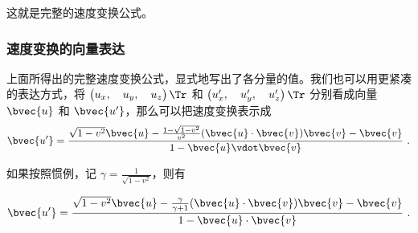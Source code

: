 这就是完整的速度变换公式。

\subsubsection{速度变换的向量表达}

上面所得出的完整速度变换公式，显式地写出了各分量的值。我们也可以用更紧凑的表达方式，将 $\left(\begin{matrix}u_x,\quad u_y,\quad u_z\end{matrix} \right)\Tr $ 和 $\left(\begin{matrix}u_x',\quad u_y',\quad u_z'\end{matrix} \right)\Tr$ 分别看成向量 $\bvec{u}$ 和 $\bvec{u'}$，那么可以把速度变换表示成
\begin{equation}\label{eq_RelVel_5}
\bvec{u'}=\frac{\sqrt{1-v^2}\bvec{u}-\frac{1-\sqrt{1-v^2}}{v^2}(\bvec{u}\cdot\bvec{v})\bvec{v}-\bvec{v}}{1-\bvec{u}\vdot\bvec{v}}~.
\end{equation}

如果按照惯例，记 $\gamma=\frac{1}{\sqrt{1-v^2}}$，则有

\begin{equation}
\bvec{u'}=\frac{\sqrt{1-v^2}\bvec{u}-\frac{\gamma}{\gamma+1}(\bvec{u}\cdot\bvec{v})\bvec{v}-\bvec{v}}{1-\bvec{u}\cdot\bvec{v}}~.
\end{equation}




